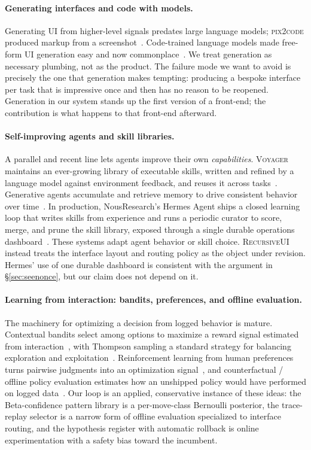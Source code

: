 \documentclass[11pt]{article}
\begin{document}
\paragraph{Generating interfaces and code with models.}
Generating UI from higher-level signals predates large language models;
\textsc{pix2code} produced markup from a screenshot~\cite{beltramelli2017pix2code}.
Code-trained language models made free-form UI generation easy and now
commonplace~\cite{chen2021codex}. We treat generation as necessary plumbing, not
as the product. The failure mode we want to avoid is precisely the one that
generation makes tempting: producing a bespoke interface per task that is
impressive once and then has no reason to be reopened. Generation in our system
stands up the first version of a front-end; the contribution is what happens to
that front-end afterward.

\paragraph{Self-improving agents and skill libraries.}
A parallel and recent line lets agents improve their own \emph{capabilities}.
\textsc{Voyager} maintains an ever-growing library of executable skills, written
and refined by a language model against environment feedback, and reuses it
across tasks~\cite{wang2023voyager}. Generative agents accumulate and retrieve
memory to drive consistent behavior over time~\cite{park2023generative}. In
production, NousResearch's Hermes Agent ships a closed learning loop that writes
skills from experience and runs a periodic curator to score, merge, and prune the
skill library, exposed through a single durable operations
dashboard~\cite{hermes2026}. These systems adapt agent behavior or skill choice.
\textsc{RecursiveUI} instead treats the interface layout and routing policy as
the object under revision. Hermes' use of one durable dashboard is consistent
with the argument in \S\ref{sec:seenonce}, but our claim does not depend on it.

\paragraph{Learning from interaction: bandits, preferences, and offline
evaluation.}
The machinery for optimizing a decision from logged behavior is mature.
Contextual bandits select among options to maximize a reward signal estimated
from interaction~\cite{li2010contextual}, with Thompson sampling a standard
strategy for balancing exploration and exploitation~\cite{thompson1933,chapelle2011thompson}.
Reinforcement learning from human preferences turns pairwise judgments into an
optimization signal~\cite{christiano2017preferences,ouyang2022instructgpt}, and
counterfactual / offline policy evaluation estimates how an unshipped policy
would have performed on logged data~\cite{bottou2013counterfactual}. Our loop is
an applied, conservative instance of these ideas: the Beta-confidence pattern
library is a per-move-class Bernoulli posterior, the trace-replay selector is a
narrow form of offline evaluation specialized to interface routing, and the
hypothesis register with automatic rollback is online experimentation with a
safety bias toward the incumbent.
\end{document}
